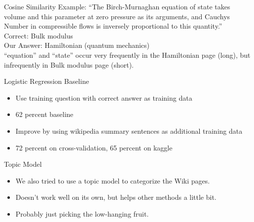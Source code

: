 \documentclass{beamer}
\begin{document}
\begin{frame}{Cosine Similarity}
   Example: ``The Birch-Murnaghan equation of state takes volume and this parameter at zero pressure as its arguments, and Cauchys Number in compressible flows is inversely proportional to this quantity.''\\[1em]
   {\color{green}Correct}: Bulk modulus\\
   {\color{red}Our Answer}: Hamiltonian (quantum mechanics)\\[1em]

   ``equation'' and ``state'' occur very frequently in the Hamiltonian page (long), but infrequently in Bulk modulus page (short).\\
\end{frame}

\begin{frame}{Logistic Regression Baseline}
   \begin{itemize}
      \item Use training question with correct answer as training data
      \item 62 percent baseline
      \item Improve by using wikipedia summary sentences as additional training data
      \item 72 percent on cross-validation, 65 percent on kaggle
   \end{itemize}
\end{frame}


\begin{frame}{Topic Model}
   \begin{itemize}
      \item We also tried to use a topic model to categorize the Wiki pages.
      \item Doesn't work well on its own, but helps other methods a little bit.
      \item Probably just picking the low-hanging fruit.
   \end{itemize}
\end{frame}
\end{document}
